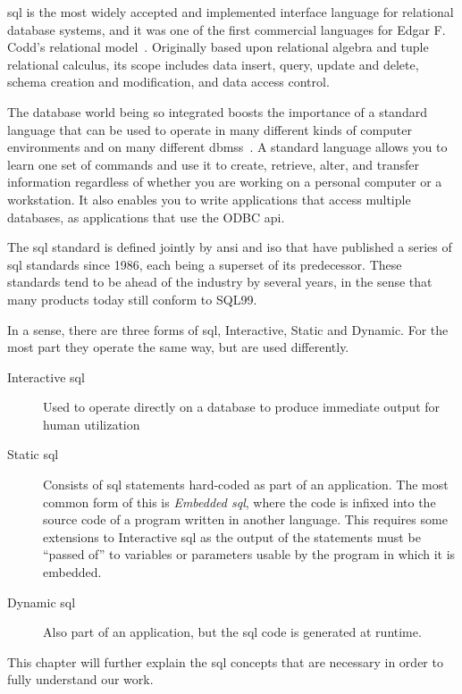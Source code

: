 \ac{sql} is the most widely accepted and implemented interface language for relational database systems, and it was one of the first commercial languages for Edgar F. Codd's relational model~\cite{codd1970relational}. Originally based upon relational algebra and tuple relational calculus, its scope includes data insert, query, update and delete, schema creation and modification, and data access control.

The database world being so integrated boosts the importance of a standard language that can be used to operate in many different kinds of computer environments and on many different \acp{dbms}~\cite{Gruber:2000:MS:518858}. A standard language allows you to learn one set of commands and use it to create, retrieve, alter, and transfer information regardless of whether you are working on a personal computer or a workstation. It also enables you to write applications that access multiple databases, as applications that use the ODBC \ac{api}.

The \ac{sql} standard is defined jointly by \ac{ansi} and \ac{iso} that have published a series of \ac{sql} standards since 1986, each being a superset of its predecessor. These standards tend to be ahead of the industry by several years, in the sense that many products today still conform to SQL99.

In a sense, there are three forms of \ac{sql}, Interactive, Static and Dynamic. For the most part they operate the same way, but are used differently.

\begin{description}
	\item[Interactive \ac{sql}] Used to operate directly on a database to produce immediate output for human utilization
	\item[Static \ac{sql}] Consists of \ac{sql} statements hard-coded as part of an application. The most common form of this is \emph{Embedded \ac{sql}}, where the code is infixed into the source code of a program written in another language. This requires some extensions to Interactive \ac{sql} as the output of the statements must be ``passed of'' to variables or parameters usable by the program in which it is embedded.
	\item[Dynamic \ac{sql}] Also part of an application, but the \ac{sql} code is generated at runtime. 
\end{description}

This chapter will further explain the \ac{sql} concepts that are necessary in order to fully understand our work.

